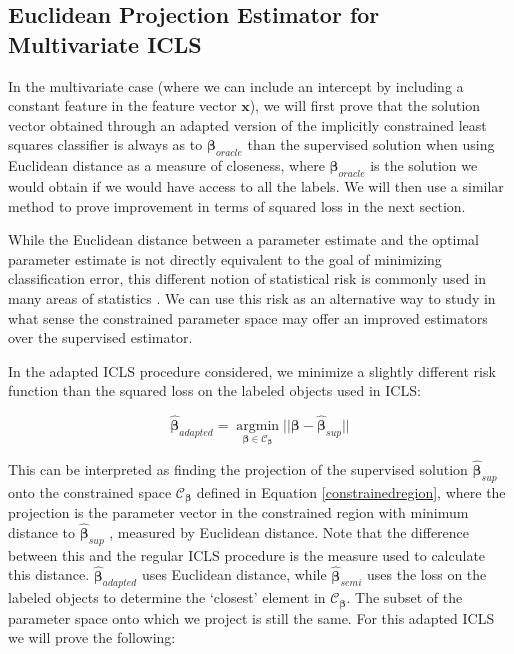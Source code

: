 \subsection{Euclidean Projection Estimator for Multivariate ICLS} \label{section:proofmultivariate}

In the multivariate case (where we can include an intercept by including a constant feature in the feature vector $\mathbf{x}$), we will first prove that the solution vector obtained through an adapted version of the implicitly constrained least squares classifier is always as to $\boldsymbol{\beta}_{oracle}$ than the supervised solution when using Euclidean distance as a measure of closeness, where $\boldsymbol{\beta}_{oracle}$ is the solution we would obtain if we would have access to all the labels. We will then use a similar method to prove improvement in terms of squared loss in the next section. 

While the Euclidean distance between a parameter estimate and the optimal parameter estimate is not directly equivalent to the goal of minimizing classification error, this different notion of statistical risk is commonly used in many areas of statistics \cite{Berger1985}. We can use this risk as an alternative way to study in what sense the constrained parameter space may offer an improved estimators over the supervised estimator.

In the adapted ICLS procedure considered, we minimize a slightly different risk function than the squared loss on the labeled objects used in ICLS:

\begin{equation} \label{eq:adaptedICLS}
\boldsymbol{\hat{\beta}}_{adapted} = \operatorname*{argmin}_{\boldsymbol{\beta} \in \mathcal{C}_{\boldsymbol{\beta}}}  ||\boldsymbol{\beta}-\boldsymbol{\hat{\beta}}_{sup}||
\end{equation}

This can be interpreted as finding the projection of the supervised solution $\boldsymbol{\hat{\beta}}_{sup}$ onto the constrained space $\mathcal{C}_{\boldsymbol{\beta}}$ defined in Equation \eqref{constrainedregion}, where the projection is the parameter vector in the constrained region with minimum distance to $\boldsymbol{\hat{\beta}}_{sup}$ , measured by Euclidean distance. Note that the difference between this and the regular ICLS procedure is the measure used to calculate this distance. $\boldsymbol{\hat{\beta}}_{adapted}$ uses Euclidean distance, while $\boldsymbol{\hat{\beta}}_{semi}$ uses the loss on the labeled objects to determine the `closest' element in $\mathcal{C}_{\boldsymbol{\beta}}$. The subset of the parameter space onto which we project is still the same. For this adapted ICLS we will prove the following:

